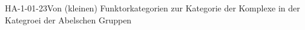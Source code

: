 
\begin{STUD}{HA-1-01-23}{Von (kleinen) Funktorkategorien zur Kategorie der Komplexe in der Kategroei der Abelschen Gruppen}
\end{STUD}
